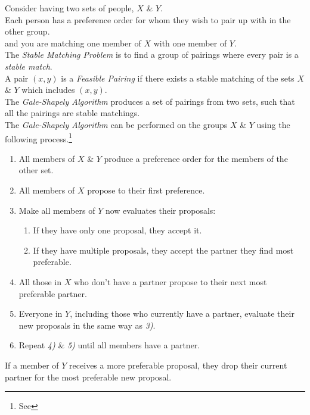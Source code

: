 \documentclass[11pt,a4paper]{article}
\begin{document}
\newpage
{}
Consider having two sets of people, $X$ \& $Y$.\\
Each person has a preference order for whom they wish to pair up with in the other group.\\
and you are matching one member of $X$ with one member of $Y$.\\
The \textit{Stable Matching Problem} is to find a group of pairings where every pair is a \textit{stable match}.\\

A pair $(x,y)$ is a \textit{Feasible Pairing} if there exists a stable matching of the sets $X$ \& $Y$ which includes $(x,y)$.\\

The \textit{Gale-Shapely Algorithm} produces a set of pairings from two sets, such that all the pairings are stable matchings.\\
The \textit{Gale-Shapely Algorithm} can be performed on the groups $X$ \& $Y$ using the following process.\footnote{See }
\begin{enumerate}[label=\arabic*)]
  \item All members of $X$ \& $Y$ produce a preference order for the members of the other set.
  \item All members of $X$ propose to their first preference.
  \item Make all members of $Y$ now evaluates their proposals:
  \begin{enumerate}[label=\roman*)]
    \item If they have only one proposal, they accept it.
    \item If they have multiple proposals, they accept the partner they find most preferable.
  \end{enumerate}
  \item All those in $X$ who don't have a partner propose to their next most preferable partner.
  \item Everyone in $Y$, including those who currently have a partner, evaluate their new proposals in the same way as \textit{3)}.
  \item Repeat \textit{4)} \& \textit{5)} until all members have a partner.
\end{enumerate}
\nb If a member of $Y$ receives a more preferable proposal, they drop their current partner for the most preferable new proposal.\\
\end{document}
